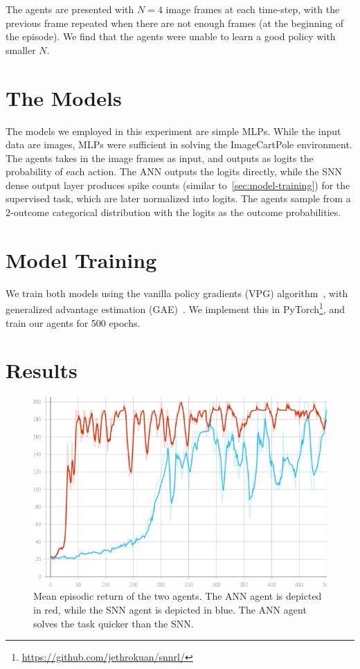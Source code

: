 \documentclass[fyp]{socreport}
\begin{document}
The agents are presented with $N = 4$ image frames at each time-step, with the
previous frame repeated when there are not enough frames (at the beginning of
the episode). We find that the agents were unable to learn a good policy with
smaller $N$.

\section{The Models}

The models we employed in this experiment are simple MLPs. While the input data
are images, MLPs were sufficient in solving the ImageCartPole environment. The
agents takes in the image frames as input, and outputs as logits the probability
of each action. The ANN outputs the logits directly, while the SNN dense output
layer produces spike counts (similar to~\autoref{sec:model-training}) for the
supervised task, which are later normalized into logits. The agents sample from
a 2-outcome categorical distribution with the logits as the outcome
probabilities.

\section{Model Training}

We train both models using the vanilla policy gradients (VPG)
algorithm~\cite{schulman2016optimizing}, with generalized advantage estimation
(GAE)~\cite{schulman2015high}. We implement this in
PyTorch\footnote{\url{https://github.com/jethrokuan/snnrl/}}, and train our
agents for 500 epochs.

\section{Results}

\begin{figure}
  \centering
  \includegraphics[width=0.55\columnwidth]{images/ep-ret-mean.png}
  \caption{Mean episodic return of the two agents. The ANN agent is depicted in red, while the SNN agent is depicted in blue. The ANN agent solves the task quicker than the SNN.}
  \label{fig:ep-ret-mean}
\end{figure}
\end{document}

